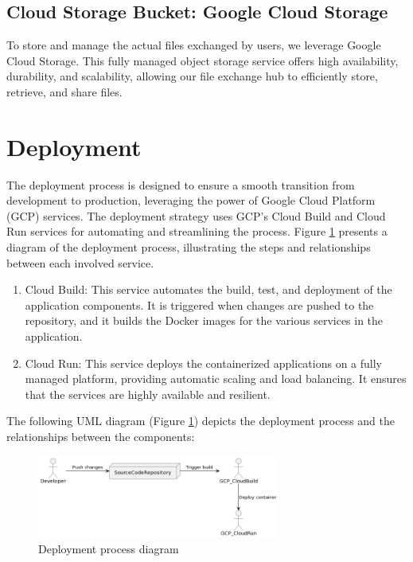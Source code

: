 \documentclass[a4paper,fleqn]{cas-dc}
\begin{document}
\subsection{Cloud Storage Bucket: Google Cloud Storage}

To store and manage the actual files exchanged by users, we leverage Google Cloud Storage. This fully managed object storage service offers high availability, durability, and scalability, allowing our file exchange hub to efficiently store, retrieve, and share files.

\section{Deployment} \label{sec:deployment}

The deployment process is designed to ensure a smooth transition from development to production, leveraging the power of Google Cloud Platform (GCP) services. The deployment strategy uses GCP's Cloud Build and Cloud Run services for automating and streamlining the process. Figure \ref{fig:deployment} presents a diagram of the deployment process, illustrating the steps and relationships between each involved service.

\begin{enumerate}
    \item Cloud Build: This service automates the build, test, and deployment of the application components. It is triggered when changes are pushed to the repository, and it builds the Docker images for the various services in the application.
    \item Cloud Run: This service deploys the containerized applications on a fully managed platform, providing automatic scaling and load balancing. It ensures that the services are highly available and resilient.
\end{enumerate}

The following UML diagram (Figure \ref{fig:deployment}) depicts the deployment process and the relationships between the components:

\begin{figure}[h]
    \centering
    \includegraphics[width=8cm]{deployment.png}
    \caption{Deployment process diagram}
    \label{fig:deployment}
\end{figure}
\end{document}
